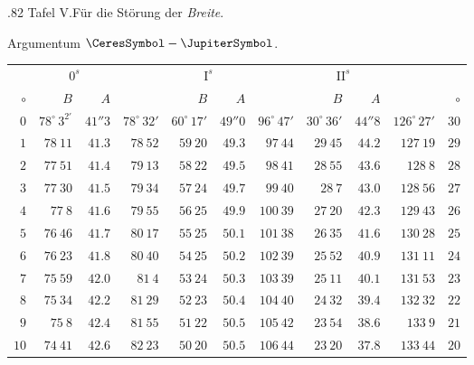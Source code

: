 \clearpage
\thispagestyle{empty}
\noindent{}%
\par\nobreak\smallskip
\begin{GaussVICeresFrame}{.82}
Tafel V.\enspace Für die Störung der \textit{Breite}.\par Argumentum $\CeresSymbol-\JupiterSymbol$.\par\medskip
{\fontsize{9}{11}\selectfont\setlength{\tabcolsep}{2.3pt}\renewcommand{\arraystretch}{1.08}
\begin{tabular}{r@{\GaussVICeresRule}r|r|r@{\GaussVICeresRule}r|r|r@{\GaussVICeresRule}r|r|r@{\GaussVICeresRule}r}
 & \multicolumn{2}{c|}{$\mathrm{0}^s$} &  & \multicolumn{2}{c|}{$\mathrm{I}^s$} &  & \multicolumn{2}{c|}{$\mathrm{II}^s$} &  & \\
$\circ$ & $B$ & $A$ &  & $B$ & $A$ &  & $B$ & $A$ &  & $\circ$ \\\hline
$0$ & $78^\circ\,3^{2'}$ & $41''3$ & $78^\circ\,32'$ & $60^\circ\,17'$ & $49''0$ & $96^\circ\,47'$ & $30^\circ\,36'$ & $44''8$ & $126^\circ\,27'$ & $30$ \\
$1$ & $78\ 11$ & $41.3$ & $78\ 52$ & $59\ 20$ & $49.3$ & $97\ 44$ & $29\ 45$ & $44.2$ & $127\ 19$ & $29$ \\
$2$ & $77\ 51$ & $41.4$ & $79\ 13$ & $58\ 22$ & $49.5$ & $98\ 41$ & $28\ 55$ & $43.6$ & $128\ 8$ & $28$ \\
$3$ & $77\ 30$ & $41.5$ & $79\ 34$ & $57\ 24$ & $49.7$ & $99\ 40$ & $28\ 7$ & $43.0$ & $128\ 56$ & $27$ \\
$4$ & $77\ 8$ & $41.6$ & $79\ 55$ & $56\ 25$ & $49.9$ & $100\ 39$ & $27\ 20$ & $42.3$ & $129\ 43$ & $26$ \\
$5$ & $76\ 46$ & $41.7$ & $80\ 17$ & $55\ 25$ & $50.1$ & $101\ 38$ & $26\ 35$ & $41.6$ & $130\ 28$ & $25$ \\[3pt]
$6$ & $76\ 23$ & $41.8$ & $80\ 40$ & $54\ 25$ & $50.2$ & $102\ 39$ & $25\ 52$ & $40.9$ & $131\ 11$ & $24$ \\
$7$ & $75\ 59$ & $42.0$ & $81\ 4$ & $53\ 24$ & $50.3$ & $103\ 39$ & $25\ 11$ & $40.1$ & $131\ 53$ & $23$ \\
$8$ & $75\ 34$ & $42.2$ & $81\ 29$ & $52\ 23$ & $50.4$ & $104\ 40$ & $24\ 32$ & $39.4$ & $132\ 32$ & $22$ \\
$9$ & $75\ 8$ & $42.4$ & $81\ 55$ & $51\ 22$ & $50.5$ & $105\ 42$ & $23\ 54$ & $38.6$ & $133\ 9$ & $21$ \\
$10$ & $74\ 41$ & $42.6$ & $82\ 23$ & $50\ 20$ & $50.5$ & $106\ 44$ & $23\ 20$ & $37.8$ & $133\ 44$ & $20$ \\[3pt]

\end{tabular}}
\end{GaussVICeresFrame}

